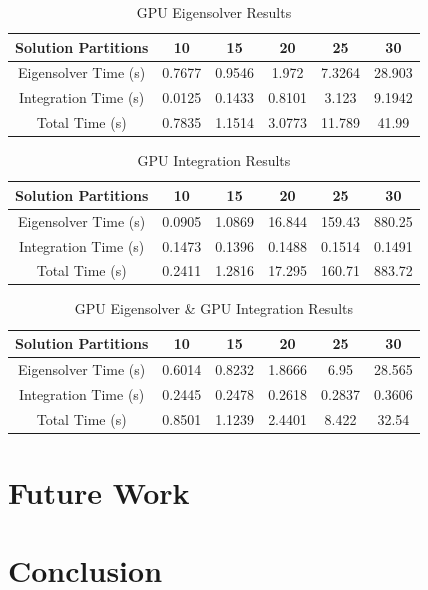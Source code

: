 \documentclass[conference, twoside]{IEEEtran}
\begin{document}
\begin{table}
    \renewcommand{\arraystretch}{1.3} %
    \caption{GPU Eigensolver Results}
    \label{gpu-eigensolver-results}
    \centering
    \begin{tabular}{c||c|c|c|c|c}
        \hline
        {Solution Partitions} & {10} & {15} & {20} & {25} & {30} \\
        \hline
        \hline
        {Eigensolver Time (s)}              & {0.7677} & {0.9546} & {1.972}  & {7.3264} & {28.903}\\
        {Integration Time (s)}              & {0.0125} & {0.1433} & {0.8101} & {3.123}  & {9.1942}\\
        {Total Time (s)}                    & {0.7835} & {1.1514} & {3.0773} & {11.789} & {41.99} \\
        \hline
    \end{tabular}
\end{table}

\begin{table}
    \renewcommand{\arraystretch}{1.3} %
    \caption{GPU Integration Results}
    \label{gpu-integration-results}
    \centering
    \begin{tabular}{c||c|c|c|c|c}
        \hline
        {Solution Partitions} & {10} & {15} & {20} & {25} & {30} \\
        \hline
        \hline
        {Eigensolver Time (s)}              & {0.0905} & {1.0869} & {16.844} & {159.43} & {880.25}\\
        {Integration Time (s)}              & {0.1473} & {0.1396} & {0.1488} & {0.1514} & {0.1491}\\
        {Total Time (s)}                    & {0.2411} & {1.2816} & {17.295} & {160.71} & {883.72}\\
        \hline
    \end{tabular}
\end{table}

\begin{table}
    \renewcommand{\arraystretch}{1.3} %
    \caption{GPU Eigensolver \& GPU Integration Results}
    \label{gpu-eigensolver-and-integration-results}
    \centering
    \begin{tabular}{c||c|c|c|c|c}
        \hline
        {Solution Partitions} & {10} & {15} & {20} & {25} & {30} \\
        \hline
        \hline
        {Eigensolver Time (s)}              & {0.6014} & {0.8232} & {1.8666} & {6.95}   & {28.565}\\
        {Integration Time (s)}              & {0.2445} & {0.2478} & {0.2618} & {0.2837} & {0.3606}\\
        {Total Time (s)}                    & {0.8501} & {1.1239} & {2.4401} & {8.422}  & {32.54} \\
        \hline
    \end{tabular}
\end{table}

\section{Future Work}

\section{Conclusion}



\end{document}
